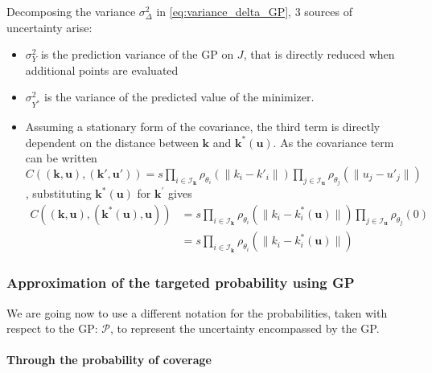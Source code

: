 \documentclass[a4paper,11pt]{article}
\newcommand{\ProbGP}{\mathcal{P}}
\newcommand{\kk}{\mathbf{k}}
\newcommand{\uu}{\mathbf{u}}
\theoremstyle{defi}
\numberwithin{thmCounter}{section}
\begin{document}
Decomposing the variance $\sigma^2_{\Delta}$ in \cref{eq:variance_delta_GP}, 3 sources of uncertainty arise:
\begin{itemize}
\item $\sigma^2_{Y}$ is the prediction variance of the GP on $J$, that is directly reduced when additional points are evaluated
\item $\sigma^2_{Y^*}$ is the variance of the predicted value of the minimizer.
  
\item Assuming a stationary form of the covariance, the third term is directly dependent on the distance between $\kk$ and $\kk^*(\uu)$. As the covariance term can be written $C((\kk,\uu), (\kk',\uu')) = s \prod_{i\in\mathcal{I}_{\kk}}\rho_{\theta_i}(\|k_i - k'_i\|) \prod_{j\in\mathcal{I}_{\uu}} \rho_{\theta_j}(\|u_j - u'_j\|)$, substituting $\kk^*(\uu)$ for $\kk^\prime$ gives
\begin{align}
  C\left((\kk,\uu),(\kk^*(\uu),\uu)\right) &= s \prod_{i\in\mathcal{I}_{\kk}}\rho_{\theta_i}(\|k_i - k^*_i(\uu)\|)\prod_{j\in\mathcal{I}_{\uu}} \rho_{\theta_j}(0) \\
  &=s \prod_{i\in\mathcal{I}_{\kk}}\rho_{\theta_i}(\|k_i - k^*_i(\uu)\|)
\end{align}
\end{itemize}


\subsubsection{Approximation of the targeted probability using GP}

  We are going now to use a different notation for the probabilities, taken with respect to the GP: $\ProbGP$, to represent the uncertainty encompassed by the GP.
  
\paragraph{Through the probability of coverage}
\end{document}
